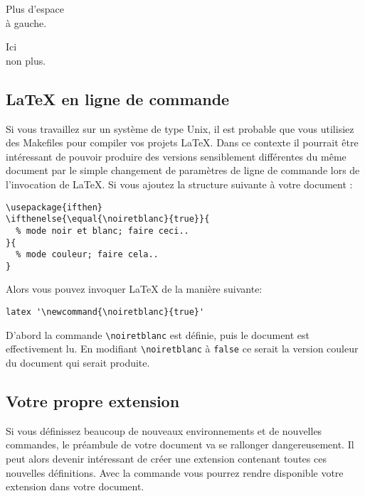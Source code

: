 \begin{example}
\newenvironment{correct}%
 {\noindent\ignorespaces}%
 {\par\noindent%
   \ignorespacesafterend}

\begin{correct}
Plus d'espace\\à gauche.
\end{correct}
Ici\\non plus.
\end{example}

\subsection{\LaTeX{} en ligne de commande}

Si vous travaillez sur un système de type Unix, il est probable que
vous utilisiez des Makefiles pour compiler vos projets \LaTeX{}. Dans
ce contexte il pourrait être intéressant de pouvoir produire des
versions sensiblement différentes du même document par le simple
changement de paramètres de ligne de commande lors de l'invocation de
\LaTeX{}. Si vous ajoutez la structure suivante à votre document :

\begin{verbatim}
\usepackage{ifthen}
\ifthenelse{\equal{\noiretblanc}{true}}{
  % mode noir et blanc; faire ceci..
}{
  % mode couleur; faire cela..
}
\end{verbatim}

Alors vous pouvez invoquer \LaTeX{} de la manière suivante:
\begin{verbatim}
latex '\newcommand{\noiretblanc}{true}'
\end{verbatim}

D'abord la commande \verb|\noiretblanc| est définie, puis le document
est effectivement lu. En modifiant \verb|\noiretblanc| à
\texttt{false} ce serait la version couleur du document qui serait
produite.

\subsection{Votre propre extension}

Si vous définissez beaucoup de nouveaux environnements et de nouvelles
commandes, le préambule de votre document va se rallonger
dangereusement. Il peut alors devenir intéressant de créer une
extension contenant toutes ces nouvelles définitions. Avec 
la commande  vous pourrez rendre disponible votre
extension dans votre document.

